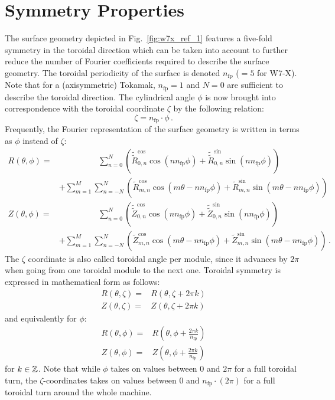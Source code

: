 \section{Symmetry Properties}
The surface geometry depicted in Fig.~\ref{fig:w7x_ref_1} features a five-fold symmetry in the toroidal direction
which can be taken into account to further reduce the number of Fourier coefficients required to describe the surface geometry.
The toroidal periodicity of the surface is denoted $n_\mathrm{fp}$ ($=5$ for W7-X).
Note that for a (axisymmetric) Tokamak, $n_\mathrm{fp}=1$ and $N=0$ are sufficient to describe the toroidal direction.
The cylindrical angle $\phi$ is now brought into correspondence with the toroidal coordinate $\zeta$
by the following relation:
\begin{equation}
  \zeta = n_\mathrm{fp} \cdot \phi \label{eqn:zeta} \, .
\end{equation}
Frequently, the Fourier representation of the surface geometry is written in terms as $\phi$ instead of $\zeta$:
\begin{align}
    R(\theta, \phi)
 =& \phantom{+ \sum_{m=1}^{M}}~~\, \sum_{n=0}^{N}
      \left( \tilde{\tilde{R}}_{0,n}^\mathrm{cos} \cos(n n_\mathrm{fp} \phi) + \tilde{\tilde{R}}_{0,n}^\mathrm{sin} \sin(n n_\mathrm{fp} \phi) \right) \nonumber \\
 ~&          + \sum_{m=1}^{M}   \sum_{n=-N}^{N}
      \left( \tilde{R}_{m,n}^\mathrm{cos} \cos(m \theta - n n_\mathrm{fp} \phi) + \tilde{R}_{m,n}^\mathrm{sin} \sin(m \theta - n n_\mathrm{fp} \phi) \right) \label{eqn:fullFourierRPhi} \\
    Z(\theta, \phi)
 =& \phantom{+ \sum_{m=1}^{M}}~~\, \sum_{n=0}^{N}
      \left( \tilde{\tilde{Z}}_{0,n}^\mathrm{cos} \cos(n n_\mathrm{fp} \phi) + \tilde{\tilde{Z}}_{0,n}^\mathrm{sin} \sin(n n_\mathrm{fp} \phi) \right) \nonumber \\
 ~&          + \sum_{m=1}^{M}   \sum_{n=-N}^{N}
      \left( \tilde{Z}_{m,n}^\mathrm{cos} \cos(m \theta - n n_\mathrm{fp} \phi) + \tilde{Z}_{m,n}^\mathrm{sin} \sin(m \theta - n n_\mathrm{fp} \phi) \right) \label{eqn:fullFourierZPhi} \, .
\end{align}
The $\zeta$ coordinate is also called toroidal angle per module,
since it advances by $2 \pi$ when going from one toroidal module to the next one.
Toroidal symmetry is expressed in mathematical form as follows:
\begin{align}
  R(\theta, \zeta) =& R \left( \theta, \zeta + 2 \pi k \right) \\
  Z(\theta, \zeta) =& Z \left( \theta, \zeta + 2 \pi k \right)
\end{align}
and equivalently for $\phi$:
\begin{align}
  R(\theta, \phi) =& R \left( \theta, \phi + \frac{2 \pi k}{n_\mathrm{fp}} \right) \\
  Z(\theta, \phi) =& Z \left( \theta, \phi + \frac{2 \pi k}{n_\mathrm{fp}} \right)
\end{align}
for $k \in \mathbb{Z}$.
Note that while $\phi$ takes on values between $0$ and $2 \pi$ for a full toroidal turn,
the $\zeta$-coordinates takes on values between $0$ and $n_\mathrm{fp} \cdot (2 \pi)$ for a full toroidal turn
around the whole machine.

